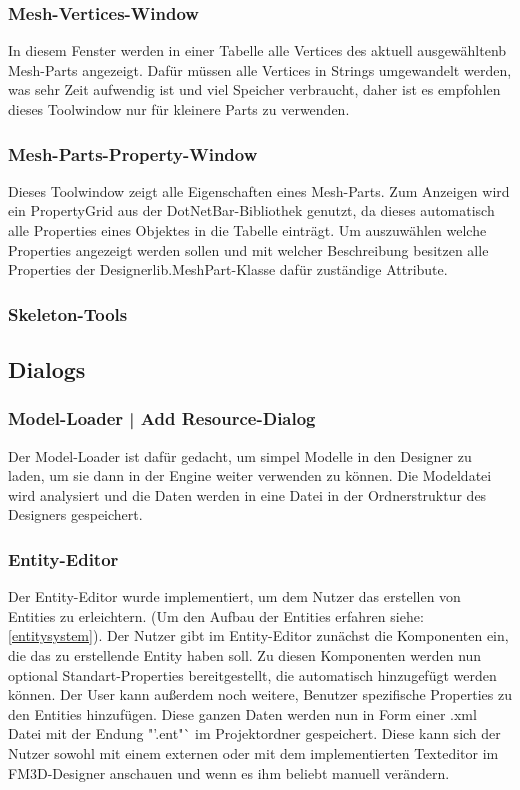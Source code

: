 \subsubsection{Mesh-Vertices-Window}
In diesem Fenster werden in einer Tabelle alle Vertices des aktuell ausgewähltenb Mesh-Parts angezeigt. Dafür müssen alle Vertices in Strings umgewandelt werden, was sehr Zeit aufwendig ist und viel Speicher verbraucht, daher ist es empfohlen dieses Toolwindow nur für kleinere Parts zu verwenden. 

\subsubsection{Mesh-Parts-Property-Window}
Dieses Toolwindow zeigt alle Eigenschaften eines Mesh-Parts. Zum Anzeigen wird ein PropertyGrid aus der DotNetBar-Bibliothek genutzt, da dieses automatisch alle Properties eines Objektes in die Tabelle einträgt. Um auszuwählen welche Properties angezeigt werden sollen und mit welcher Beschreibung besitzen alle Properties der Designerlib.MeshPart-Klasse dafür zuständige Attribute.

\subsubsection{Skeleton-Tools}

\subsection{Dialogs}
\subsubsection{Model-Loader | Add Resource-Dialog}
Der Model-Loader ist dafür gedacht, um simpel Modelle in den Designer zu laden, um sie dann in der Engine weiter verwenden zu können. Die Modeldatei wird analysiert und die Daten werden in eine Datei in der Ordnerstruktur des Designers gespeichert.
\todo[inline]{!!!}

\subsubsection{Entity-Editor}
\label{entityeditor}
Der Entity-Editor wurde implementiert, um dem Nutzer das erstellen von Entities zu erleichtern. (Um den Aufbau der Entities erfahren siehe: \ref{entitysystem}). Der Nutzer gibt im Entity-Editor zunächst die Komponenten ein, die das zu erstellende Entity haben soll. Zu diesen Komponenten werden nun optional Standart-Properties bereitgestellt, die automatisch hinzugefügt werden können. Der User kann außerdem noch weitere, Benutzer spezifische Properties zu den Entities hinzufügen. Diese ganzen Daten werden nun in Form einer .xml Datei mit der Endung "'.ent"` im Projektordner gespeichert. Diese kann sich der Nutzer sowohl mit einem externen oder mit dem implementierten Texteditor im FM3D-Designer anschauen und wenn es ihm beliebt manuell verändern.


